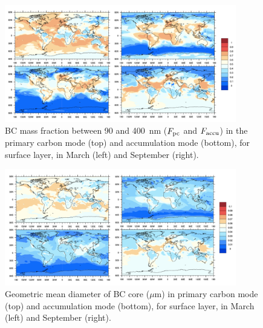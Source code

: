 \documentclass[12pt, fullpage]{uiucthesis2009}
\begin{document}
	\begin{figure}[h] 
		\begin{center}
			\includegraphics[width = 0.9\textwidth]{Rplot02}
			\caption[BC mass fraction between 90 and 400~nm ($F_{\rm pc}$ and $F_{\rm accu}$) in the primary carbon mode (top) and accumulation mode (bottom), for surface layer, in March and September]{\label{fig_R5} BC mass fraction between 90 and 400~nm ($F_{\rm pc}$ and $F_{\rm accu}$) in the primary carbon mode (top) and accumulation mode (bottom), for surface layer, in March (left) and September (right).}
		\end{center}
	\end{figure}
	
	\begin{figure}[h] 
		\begin{center}
			\includegraphics[width = 0.9\textwidth]{Rplot03}
			\caption[Geometric mean diameter of BC core ($\mu$m) in primary carbon mode (top) and accumulation mode (bottom), for surface layer, in March and September]{\label{fig_R6} Geometric mean diameter of BC core ($\mu$m) in primary carbon mode (top) and accumulation mode (bottom), for surface layer, in March (left) and September (right).}
		\end{center}
	\end{figure}
	
	
	
\end{document}
